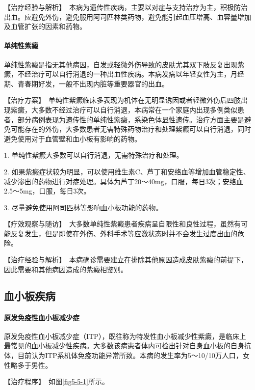 【治疗经验与解析】　本病为遗传性疾病，主要以对症与支持治疗为主，积极防治出血。应避免外伤，避免服用阿司匹林类药物，避免能引起血压增高、血容量增加及血管扩张的因素和药物。

\paragraph{单纯性紫癜}

单纯性紫癜是指无其他病因，自发或轻微外伤导致的皮肤尤其双下肢反复出现紫癜，不经治疗可以自行消退的一种出血性疾病。本病发病以年轻女性为主，月经期、青春期好发，一般不出现内脏等重要器官的出血。

【治疗方案】　单纯性紫癜临床多表现为机体在无明显诱因或者轻微外伤后四肢出现紫癜，大多数不经过治疗可以自行消退，本病常在一个家庭内出现多例类似患者，部分病例表现为遗传性的单纯性紫癜，系染色体显性遗传。治疗方面主要是避免可能存在的外伤，大多数患者无需特殊药物治疗和处理紫癜可以自行消退，同时避免使用对于血管壁和血小板有影响的药物。

1. 单纯性紫癜大多数可以自行消退，无需特殊治疗和处理。

2.
如果紫癜症状较为明显，可以使用维生素C、芦丁和安络血等增加血管稳定性、减少渗出的药物进行对症处理。具体为芦丁20～40mg，口服，每日3次；安络血2.5～5mg，口服，每日3次。

3. 尽量避免使用阿司匹林等影响血小板功能的药物。

【疗效观察与随访】　大多数单纯性紫癜患者疾病呈自限性和良性过程，虽然有可能反复发生，但是即使在外伤、外科手术等应激状态时并不会发生过度出血的危险。

【治疗经验与解析】　本病确诊需要建立在排除其他原因造成皮肤紫癜的前提下，因此需要和其他病因造成的紫癜相鉴别。

\subsection{血小板疾病}

\paragraph{原发免疫性血小板减少症}

原发免疫性血小板减少症（ITP），既往称为特发性血小板减少性紫癜，是临床上最常见的血小板减少性疾病。大多数该病患者体内可检出针对自身血小板的自身抗体，目前认为ITP系机体免疫功能异常所致。本病的发生率为5～10/10万人口，女性略多于男性。

【治疗程序】　如图\ref{fig5-5-1}所示。

